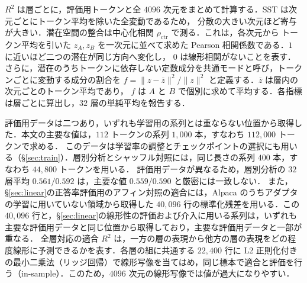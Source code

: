 \documentclass[techrep,noauthor]{ipsj}
\newcommand{\rev}[1]{{\color{blue}#1}}
\newcommand{\revr}[1]{{\color{red}#1}}
\newcommand{\revp}[1]{{\color{violet}#1}}
\newcommand{\revy}[1]{{\color{revyellow}#1}}
\newcommand{\Rsq}{R^2}
\begin{document}
$\Rsq$ は層ごとに，\rev{評価用トークン}と全 $4096$ 次元をまとめて計算する．$\mathrm{SST}$ は次元ごとにトークン平均を除いた全変動であるため，
分散の大きい次元ほど寄与が大きい．潜在空間の\revp{整合}は中心化相関 $\rho_{\mathrm{ctr}}$ で測る．これは，各次元から
トークン平均を引いた $z_A,z_B$ を一次元に並べて求めた Pearson 相関係数である．$1$ に近いほど二つの潜在が同じ方向へ変化し，
$0$ は線形相関がないことを表す．さらに，\rev{潜在のうちトークンに依存しない定数成分を共通モードと呼び，}トークンごとに変動する成分の割合を
$f=\lVert z-\overline z\rVert^2/\lVert z\rVert^2$ と定義する．$\overline z$ は層内の次元ごとのトークン平均であり，
$f$ は $A$ と $B$ で個別に求めて平均する．各指標は層ごとに算出し，$32$ 層の単純平均を報告する．

\revr{評価用データは二つあり，いずれも学習用の系列とは重ならない位置から取得した．本文の主要な値は，$112$ トークンの系列 $1{,}000$ 本，すなわち $112{,}000$ トークンで求める．
このデータは学習率の調整とチェックポイントの選択にも用いる（\S\ref{sec:train}）．層別分析とシャッフル対照には，同じ長さの系列 $400$ 本，すなわち $44{,}800$ トークンを用いる．
評価用データが異なるため，層別分析の $32$ 層平均 $0.561/0.592$ は，主要な値 $0.559/0.590$ と厳密には一致しない．
また，\S\ref{sec:linear}の正答率評価用のアフィン対照の適合には，Alpaca のうちアダプタの学習に用いていない領域から取得した $40{,}096$ 行の標準化残差を用いる．}\revy{この $40{,}096$ 行と，\S\ref{sec:linear}の線形性の評価および介入に用いる系列は，いずれも主要な評価用データと同じ位置から取得しており，主要な評価用データと一部が重なる．}
全層対応の適合 $R^2$ は，\rev{一方の層の表現から他方の層の表現をどの程度線形に予測できるかを表す}．各層の組に共通する $22{,}400$ 行に\rev{ L2 正則化付きの最小二乗法（リッジ回帰）で線形写像を当てはめ}，同じ標本で適合と評価を行う（in-sample）．\revr{このため，$4096$ 次元の線形写像では値が過大になりやすい．}
\end{document}
